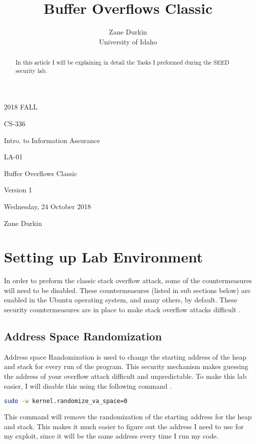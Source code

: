 \documentclass[14pt]{extarticle}
\begin{document}
\title{Buffer Overflows Classic}

\author{Zane Durkin\\
    University of Idaho}
\begin{description}[leftmargin=!, labelwidth=\widthof{\bfseries Author(s) Name(s)}]
\item [Year and Semester] 2018 FALL
\item [Course Number] CS-336
\item [Course Title] Intro. to Information Assurance
\item [Work Number] LA-01
\item [Work Name] Buffer Overflows Classic
\item [Work Version] Version 1
\item [Long Date] Wednesday, 24 October 2018
\item [Author(s) Name(s)] Zane Durkin
\end{description}
\begin{abstract}
In this article I will be explaining in detail the Tasks I preformed during the SEED security lab.
\end{abstract}

\section{Setting up Lab Environment}
In order to preform the classic stack overflow attack, some of the countermeasures will need to be disabled. These countermeasures (listed in sub sections below) are enabled in the Ubuntu operating system, and many others, by default. These security countermeasures are in place to make stack overflow attacks difficult \cite{seed-bof}.

\subsection{Address Space Randomization}
Address space Randomization is used to change the starting address of the heap and stack for every run of the program. This security mechanism makes guessing the address of your overflow attack difficult and unpredictable. To make this lab easier, I will disable this using the following command \cite{seed-bof}.
\begin{lstlisting}[language=bash]
sudo -w kernel.randomize_va_space=0
\end{lstlisting}
This command will remove the randomization of the starting address for the heap and stack. This makes it much easier to figure out the address I need to use for my exploit, since it will be the same address every time I run my code.
\end{document}
